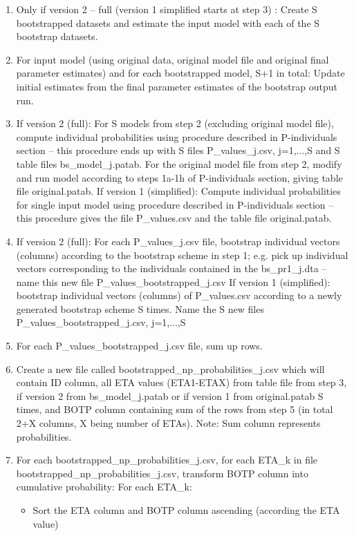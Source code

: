 \documentclass[a4paper,12pt]{article}
\begin{document}
\begin{enumerate}
\item Only if version 2 – full (version 1 simplified starts at step 3) : Create S bootstrapped datasets and estimate the input model with each of the S bootstrap datasets. 
\item For input model (using original data, original model file and original final parameter estimates) and for each bootstrapped model, S+1 in total: Update initial estimates from the final parameter estimates of the bootstrap output run. 
\item If version 2 (full): For S models from step 2 (excluding original model file), compute individual probabilities using procedure described in P-individuals section – this procedure ends up with S files P\_values\_j.csv, j=1,...,S and S table files bs\_model\_j.patab. For the original model file from step 2, modify and run model according to steps 1a-1h of P-individuals section, giving table file original.patab.
	If version 1 (simplified): Compute individual probabilities for single input model using 	procedure described in P-individuals section – this procedure gives the file P\_values.csv and the 	table file original.patab.
\item If version 2 (full): For each P\_values\_j.csv file, bootstrap individual vectors (columns) according to the bootstrap scheme in step 1; e.g. pick up individual vectors corresponding to the individuals contained in the bs\_pr1\_j.dta – name this new file P\_values\_bootstrapped\_j.csv
	If version 1 (simplified): bootstrap individual vectors (columns) of P\_values.csv according to a 	newly generated bootstrap scheme S times. Name the S new files P\_values\_bootstrapped\_j.csv, 	j=1,...,S
\item For each P\_values\_bootstrapped\_j.csv file, sum up rows.
\item Create a new file called bootstrapped\_np\_probabilities\_j.csv which will contain ID column, all ETA values (ETA1-ETAX) from table file from step 3, if version 2 from bs\_model\_j.patab or if version 1 from original.patab S times, and BOTP column containing sum of the rows from step 5 (in total 2+X columns, X being number of ETAs). Note: Sum column represents probabilities.
\item For each bootstrapped\_np\_probabilities\_j.csv, for each ETA\_k in file bootstrapped\_np\_probabilities\_j.csv, transform BOTP column into cumulative probability:
	For each ETA\_k:
\begin{itemize}
	\item Sort the ETA column and BOTP column ascending (according the ETA value) 

\end{itemize}
\end{enumerate}
\end{document}
